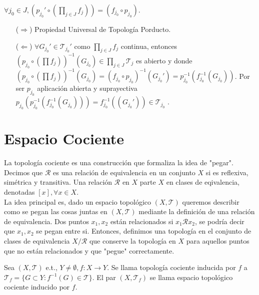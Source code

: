 \begin{dem}
  $\forall j_{0} \in J, (p_{j_{0}}' \circ (\prod_{j \in J} f_{j})) = (f_{j_{0}} \circ p_{j_{0}})$.
  \begin{enumerate}[label=(\roman*)]
    \item [($\Rightarrow$)] Propiedad Universal de Topología Porducto.
    \item [($\Leftarrow$)] $\forall G_{j_{0}}' \in \mathcal{T}_{j_{0}}'$ como $\prod_{j \in J} f_{j}$ continua, entonces $(p_{j_{0}} \circ (\prod f_{j}))^{-1}(G_{j_{0}}) \in \prod_{j \in J} \mathcal{T}_{j}$ es abierto y donde $(p_{j_{0}} \circ (\prod f_{j}))^{-1}(G_{j_{0}}) = (f_{j_{0}} \circ p_{j_{0}})^{-1}(G_{j_{0}}') = p_{j_{0}}^{-1}(f_{j_{0}}^{-1}(G_{j_{0}}))$. Por ser $p_{j_{0}}$ aplicación abierta y suprayectiva $p_{j_{0}}(p_{j_{0}}^{-1}(f_{j_{0}}^{-1}(G_{j_{0}}))) = f_{j_{0}}^{-1}((G_{j_{0}}')) \in \mathcal{T}_{j_{0}}$ .
  \end{enumerate}
\end{dem}

\section{Espacio Cociente}

\begin{note}
  La topología cociente es una construcción que formaliza la idea de "pegar". Decimos que $\mathcal{R}$ es una relación de equivalencia en un conjunto $X$ si es reflexiva, simétrica y transitiva. Una relación $\mathcal{R}$ en $X$ parte $X$ en clases de eqivalencia, denotadas $[ x ], \forall x \in X$. \\

  La idea principal es, dado un espacio topológico $( X, \mathcal{T} )$ queremos describir como se pegan las cosas juntas en $( X, \mathcal{T} )$ mediante la definición de una relación de equivalencia. Dos puntos $x_{1}, x_{2}$ están relacionados si $x_{1} \mathcal{R} x_{2}$, se podría decir que $x_{1}, x_{2}$ se pegan entre si. Entonces, definimos una topología en el conjunto de clases de equivalencia $X / \mathcal{R}$ que conserve la topología en $X$ para aquellos puntos que no están relacionados y que "pegue" correctamente.
\end{note}

\begin{defn}
  Sea $( X, \mathcal{T} )$ e.t., $Y \neq \emptyset, f: X \to Y$. Se llama topología cociente inducida por $f $ a $\mathcal{T}_{f} = \{ G \subset Y : f^{-1}(G) \in \mathcal{T} \}$. El par $( X , \mathcal{T}_{f})$ se llama espacio topológico cociente inducido por $f$.
\end{defn}

